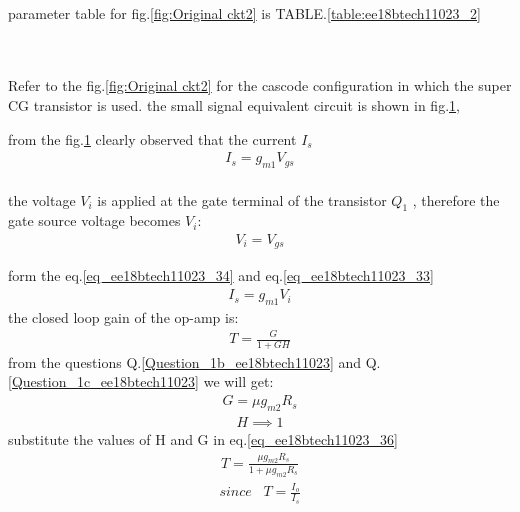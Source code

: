 \begin{enumerate}[label=\thesection.\arabic*.,ref=\thesection.\theenumi]
\\parameter table for fig.\ref{fig:Original ckt2}  is
TABLE.\ref{table:ee18btech11023_2}
\begin{table}[]
    \centering
  	\resizebox{\columnwidth}{!}{}
    \caption{}
    \label{table:ee18btech11023_2}
\end{table}\\
\solution\\
Refer to the fig.\ref{fig:Original ckt2} for the cascode configuration in which the super CG transistor is used.  the small signal equivalent circuit is shown in 
fig.\ref{fig:small ckt2},

\begin{figure}[!ht]
	\begin{center}
			\resizebox{\columnwidth}{!}{}
	\end{center}
\caption{}
\label{fig:small ckt2}
\end{figure}

from the fig.\ref{fig:small ckt2} clearly observed that the current $I_s$
\begin{align}
    I_s = g_{m1} V_{gs}
    \label{eq_ee18btech11023_33}
\end{align}\\
the voltage $V_i$ is applied at the gate terminal of the transistor $Q_1$ ,
therefore the gate source voltage becomes $V_i$\;:
\begin{align}
    V_i = V_{gs}
    \label{eq_ee18btech11023_34}
\end{align}

form the eq.\ref{eq_ee18btech11023_34} and eq.\ref{eq_ee18btech11023_33}
\begin{align}
    I_s = g_{m1} V_i
    \label{eq_ee18btech11023_35}
\end{align}
the closed loop gain of the op-amp is:
\begin{align}
    T = \frac{G}{1 + GH}
    \label{eq_ee18btech11023_36}
\end{align}
from the questions  Q.\ref{Question_1b_ee18btech11023} and Q.\ref{Question_1c_ee18btech11023}
 we will get:
\begin{align}
    G = \mu g_{m2}R_s
    \label{eq_ee18btech11023_37}
\end{align}
\begin{align}
    H \implies 1
    \label{eq_ee18btech11023_38}
\end{align}
substitute the values of H and G in eq.\ref{eq_ee18btech11023_36}
\begin{align}
    T = \frac{\mu g_{m2}R_s}{1 + \mu g_{m2}R_s}
    \label{eq_ee18btech11023_39}
\end{align}
\begin{align*}
    since \;\;\;  T = \frac{I_o}{I_s}
\end{align*}


\end{enumerate}
